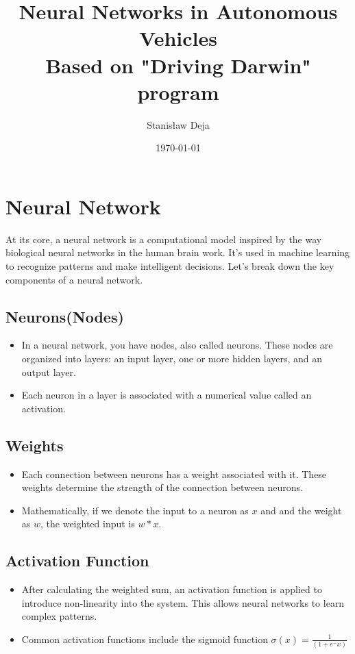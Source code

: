 \documentclass[10pt,a4paper]{article}
\author{Stanisław Deja}
\title{Neural Networks in Autonomous Vehicles \\
\small Based on "Driving Darwin" program}
\date{\today}
\begin{document}
\maketitle

\tableofcontents
\section{Neural Network}
At its core, a neural network is a computational model inspired by the way biological neural networks in the human brain work. It's used in machine learning to recognize patterns and make intelligent decisions. Let's break down the key components of a neural network.
\subsection{Neurons(Nodes)}
    \begin{itemize}
        \item In a neural network, you have nodes, also called neurons. These nodes are organized into layers: an input layer, one or more hidden layers, and an output layer.
        \item Each neuron in a layer is associated with a numerical value called an activation.
    \end{itemize}
\subsection{Weights}
    \begin{itemize}
\item Each connection between neurons has a weight associated with it. These weights determine the strength of the connection between neurons.
\item Mathematically, if we denote the input to a neuron as $x$ and and the weight as $w$, the weighted input is $w*x$.
    \end{itemize}
\subsection{Activation Function}
\begin{itemize}
    \item After calculating the weighted sum, an activation function is applied to introduce non-linearity into the system. This allows neural networks to learn complex patterns.
    \item Common activation functions include the sigmoid function \begin{math}\sigma(x)=\frac{1}{(1+e^-x)}\end{math}
\end{itemize}
\end{document}
